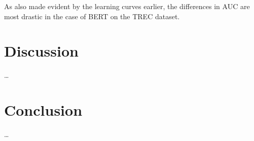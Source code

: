 \documentclass[english,bachelor,ul]{webisthesis} %
\begin{document}
As also made evident by the learning curves earlier, the differences in AUC are most drastic in the case of BERT on the TREC dataset.

\chapter{Discussion}

\dots

\chapter{Conclusion}

\dots






%
%

%

\end{document}

